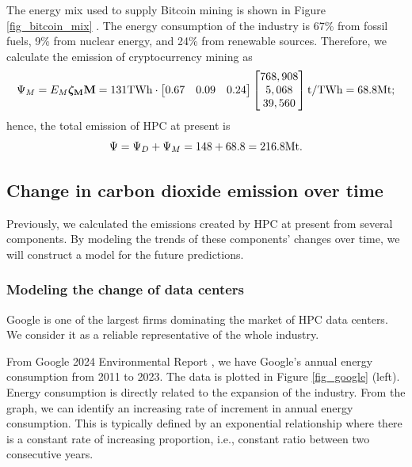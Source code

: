 \documentclass[12pt]{article}
\begin{document}
The energy mix used to supply Bitcoin mining is shown in Figure \ref{fig_bitcoin_mix} \citep{bitcoin_mix}. The energy consumption of the industry is 67\% from fossil fuels, 9\% from nuclear energy, and 24\% from renewable sources. Therefore, we calculate the  emission of cryptocurrency mining as
\begin{equation}
	\Psi_M = E_M \boldsymbol{\rm \zeta_M} \vb{M}
	= 131 {\rm TWh} \cdot \begin{bmatrix}
		0.67 & 0.09 & 0.24
	\end{bmatrix}\begin{bmatrix}
		768,908 \\ 5,068 \\ 39,560
	\end{bmatrix} {\rm t/TWh}
	= 68.8 {\rm Mt};
\end{equation}
hence, the total  emission of HPC at present is
\begin{equation}
	\Psi = \Psi_D + \Psi_M = 148 + 68.8 = 216.8 {\rm Mt}.
\end{equation}

\subsection{Change in carbon dioxide emission over time}

Previously, we calculated the  emissions created by HPC at present from several components. By modeling the trends of these components' changes over time, we will construct a model for the future predictions.

\subsubsection{Modeling the change of data centers}

Google is one of the largest firms dominating the market of HPC data centers. We consider it as a reliable representative of the whole industry.

From Google 2024 Environmental Report \citep{google_report}, we have Google's annual energy consumption from 2011 to 2023. The data is plotted in Figure \ref{fig_google} (left). Energy consumption is directly related to the expansion of the industry. From the graph, we can identify an increasing rate of increment in annual energy consumption. This is typically defined by an exponential relationship where there is a constant rate of increasing proportion, i.e., constant ratio between two consecutive years.
\end{document}
